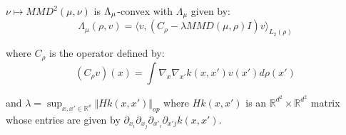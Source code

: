 \begin{proposition}
\label{prop:lambda_convexity}$\nu\mapsto MMD^{2}(\mu,\nu)$ is $\text{\ensuremath{\Lambda_{\mu}}}$-convex
with $\Lambda_{\mu}$ given by:
\begin{equation}
\Lambda_{\mu}(\rho,v)=\langle v,(C_{\rho}-\lambda MMD(\mu,\rho)I)v\rangle_{L_{2}(\rho)}\label{eq:Lambda}
\end{equation}

where $C_{\rho}$ is the operator defined by:
\[
(C_{\rho}v)(x)=\int\nabla_{x}\nabla_{x'}k(x,x')v(x')d\rho(x')
\]

and $\lambda=\sup_{x,x'\in\mathbb{\mathbb{R}^{d}}}\Vert Hk(x,x')\Vert_{op}$
where $Hk(x,x')$ is an $\mathbb{R}^{d^{2}}\times\mathbb{R}^{d^{2}}$
matrix whose entries are given by $\partial_{x_{i}}\partial_{x_{j}}\partial_{x'_{i}}\partial_{x'j}k(x,x')$.
\end{proposition}
%
